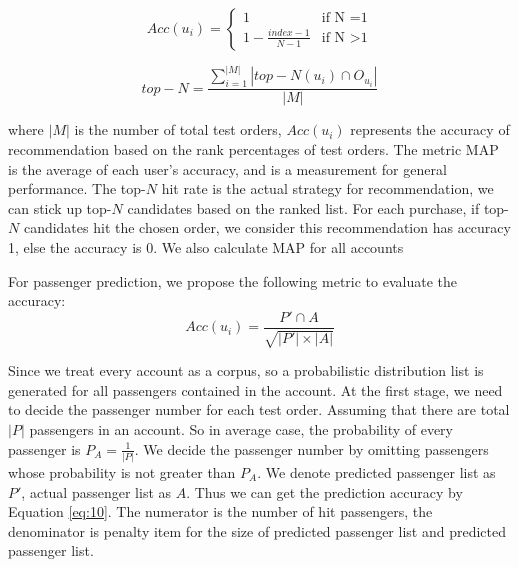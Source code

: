\documentclass{llncs}
\begin{document}
\begin{equation}
Acc(u_i) =
\begin{cases}
1 & \mbox{if N =1}\\
1 - \frac{index-1}{N-1} & \mbox{if N >1}
\end{cases}
\end{equation}

\begin{equation}
top-N = \frac{\sum_{i=1}^{|M|}|top-N(u_i) \cap O_{u_i}|}{|M|}
\end{equation}

where $|M|$ is the number of total test orders, $Acc(u_i)$ represents the accuracy of recommendation based on the rank percentages of test orders. The metric MAP is the average of each user's accuracy, and is a measurement for general performance. The top-$N$ hit rate is the actual strategy for recommendation, we can stick up top-$N$ candidates based on the ranked list. For each purchase, if top-$N$ candidates hit the chosen order, we consider this recommendation has accuracy 1, else the accuracy is 0. We also calculate MAP for all accounts \par
For passenger prediction, we propose the following metric to evaluate the accuracy:\\
\begin{equation}
\label{eq:10}
Acc(u_i) = \frac{P' \cap A}{\sqrt{|P'| \times |A|}}
\end{equation}\par
Since we treat every account as a corpus, so a probabilistic distribution list is generated for all passengers contained in the account. At the first stage, we need to decide the passenger number for each test order. Assuming that there are total $|P|$ passengers in an account. So in average case, the probability of every passenger is $P_A = \frac{1}{|P|}$. We decide the passenger number by omitting passengers whose probability is not greater than $P_A$. We denote predicted passenger list as $P'$, actual passenger list as $A$. Thus we can get the prediction accuracy by Equation \ref{eq:10}. The numerator is the number of hit passengers, the denominator is penalty item for the size of predicted passenger list and predicted passenger list.
\end{document}
